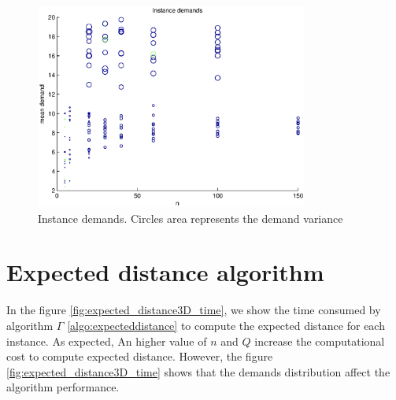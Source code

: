 \begin{figure}[!htbp]
  \begin{center}
   \includegraphics[width=0.8\textwidth]{Images/Chapter5/demands.eps}
  \end{center}
    \caption{Instance demands. Circles area represents the demand variance}\label{fig:demands}
\end{figure}

\section{Expected distance algorithm}\label{sec:test_expecteddistance}


In the figure \ref{fig:expected_distance3D_time}, we show the time consumed by algorithm $\Gamma$ \ref{algo:expecteddistance} to compute the expected distance for each instance. As expected, An higher value of $n$ and $Q$ increase the computational cost to compute expected distance. However, the figure \ref{fig:expected_distance3D_time} shows that the demands distribution affect the algorithm performance.

